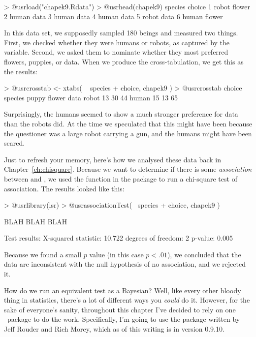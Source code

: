 \begin{rblock1}
> @usr{load("chapek9.Rdata")}
> @usr{head(chapek9)}
  species choice
1   robot flower
2   human   data
3   human   data
4   human   data
5   robot   data
6   human flower
\end{rblock1}
\noindent
In this data set, we supposedly sampled 180 beings and measured two things. First, we checked whether they were humans or robots, as captured by the  variable. Second, we asked them to nominate whether they most preferred flowers, puppies, or data. When we produce the cross-tabulation, we get this as the results:

\begin{rblock1}
> @usr{crosstab <- xtabs( ~ species + choice, chapek9 )}
> @usr{crosstab}
       choice
species puppy flower data
  robot    13     30   44
  human    15     13   65
\end{rblock1}

\noindent
Surprisingly, the humans seemed to show a much stronger preference for data than the robots did. At the time we speculated that this might have been because the questioner was a large robot carrying a gun, and the humans might have been scared. 


Just to refresh your memory, here's how we analysed these data back in Chapter~\ref{ch:chisquare}. Because we want to determine if there is some {\it association} between  and , we used the  function in the  package to run a chi-square test of association. The results looked like this:
\begin{rblock1}
> @usr{library(lsr)}
> @usr{associationTest( ~species + choice, chapek9 )}

BLAH BLAH BLAH 

Test results: 
   X-squared statistic:  10.722 
   degrees of freedom:  2 
   p-value:  0.005 
\end{rblock1}
Because we found a small $p$ value (in this case $p<.01$), we concluded that the data are inconsistent with the null hypothesis of no association, and we rejected it. 


How do we run an equivalent test as a Bayesian? Well, like every other bloody thing in statistics, there's a lot of different ways you {\it could} do it. However, for the sake of everyone's sanity, throughout this chapter I've decided to rely on one \R\ package to do the work. Specifically, I'm going to use the  package written by Jeff Rouder and Rich Morey, which as of this writing is in version 0.9.10. 

